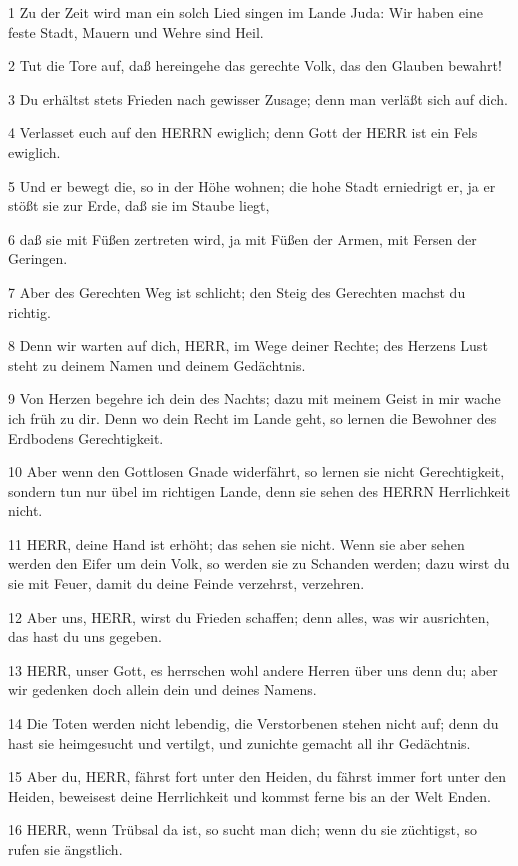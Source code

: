 \par 1 Zu der Zeit wird man ein solch Lied singen im Lande Juda: Wir haben eine feste Stadt, Mauern und Wehre sind Heil.
\par 2 Tut die Tore auf, daß hereingehe das gerechte Volk, das den Glauben bewahrt!
\par 3 Du erhältst stets Frieden nach gewisser Zusage; denn man verläßt sich auf dich.
\par 4 Verlasset euch auf den HERRN ewiglich; denn Gott der HERR ist ein Fels ewiglich.
\par 5 Und er bewegt die, so in der Höhe wohnen; die hohe Stadt erniedrigt er, ja er stößt sie zur Erde, daß sie im Staube liegt,
\par 6 daß sie mit Füßen zertreten wird, ja mit Füßen der Armen, mit Fersen der Geringen.
\par 7 Aber des Gerechten Weg ist schlicht; den Steig des Gerechten machst du richtig.
\par 8 Denn wir warten auf dich, HERR, im Wege deiner Rechte; des Herzens Lust steht zu deinem Namen und deinem Gedächtnis.
\par 9 Von Herzen begehre ich dein des Nachts; dazu mit meinem Geist in mir wache ich früh zu dir. Denn wo dein Recht im Lande geht, so lernen die Bewohner des Erdbodens Gerechtigkeit.
\par 10 Aber wenn den Gottlosen Gnade widerfährt, so lernen sie nicht Gerechtigkeit, sondern tun nur übel im richtigen Lande, denn sie sehen des HERRN Herrlichkeit nicht.
\par 11 HERR, deine Hand ist erhöht; das sehen sie nicht. Wenn sie aber sehen werden den Eifer um dein Volk, so werden sie zu Schanden werden; dazu wirst du sie mit Feuer, damit du deine Feinde verzehrst, verzehren.
\par 12 Aber uns, HERR, wirst du Frieden schaffen; denn alles, was wir ausrichten, das hast du uns gegeben.
\par 13 HERR, unser Gott, es herrschen wohl andere Herren über uns denn du; aber wir gedenken doch allein dein und deines Namens.
\par 14 Die Toten werden nicht lebendig, die Verstorbenen stehen nicht auf; denn du hast sie heimgesucht und vertilgt, und zunichte gemacht all ihr Gedächtnis.
\par 15 Aber du, HERR, fährst fort unter den Heiden, du fährst immer fort unter den Heiden, beweisest deine Herrlichkeit und kommst ferne bis an der Welt Enden.
\par 16 HERR, wenn Trübsal da ist, so sucht man dich; wenn du sie züchtigst, so rufen sie ängstlich.
